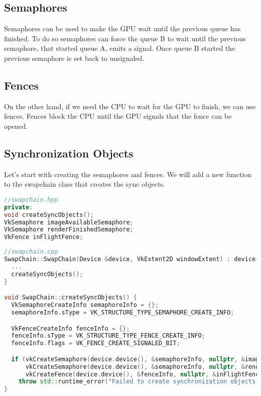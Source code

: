 \documentclass[12pt]{report} \usepackage{preamble}
\begin{document}
\subsection{Semaphores}

Semaphores can be used to make the GPU wait until the previous queue has finished. To do so semaphores can force the
queue B to wait until the previous semaphore, that started queue A, emits a signal. Once queue B started the previous semaphore
is set back to unsignaled.

\subsection{Fences}

On the other hand, if we need the CPU to wait for the GPU to finish, we can use fences. Fences block the CPU until the GPU
signals that the fence can be opened.

\subsection{Synchronization Objects}

Let's start with creating the semaphores and fences. We will add a new function to the swapchain class that creates the sync objects.

\begin{lstlisting}[language=C++]
//swapchain.hpp
private:
void createSyncObjects();
VkSemaphore imageAvailableSemaphore;
VkSemaphore renderFinishedSemaphore;
VkFence inFlightFence;
\end{lstlisting}

\begin{lstlisting}[language=C++]
//swapchain.cpp
SwapChain::SwapChain(Device &device, VkExtent2D windowExtent) : device{device} {
  ...
  createSyncObjects();
}

void SwapChain::createSyncObjects() {
  VkSemaphoreCreateInfo semaphoreInfo = {};
  semaphoreInfo.sType = VK_STRUCTURE_TYPE_SEMAPHORE_CREATE_INFO;

  VkFenceCreateInfo fenceInfo = {};
  fenceInfo.sType = VK_STRUCTURE_TYPE_FENCE_CREATE_INFO;
  fenceInfo.flags = VK_FENCE_CREATE_SIGNALED_BIT;

  if (vkCreateSemaphore(device.device(), &semaphoreInfo, nullptr, &imageAvailableSemaphore) != VK_SUCCESS ||
      vkCreateSemaphore(device.device(), &semaphoreInfo, nullptr, &renderFinishedSemaphore) != VK_SUCCESS ||
      vkCreateFence(device.device(), &fenceInfo, nullptr, &inFlightFence) != VK_SUCCESS)
    throw std::runtime_error("Failed to create synchronization objects!");
}
\end{lstlisting}
\end{document}
